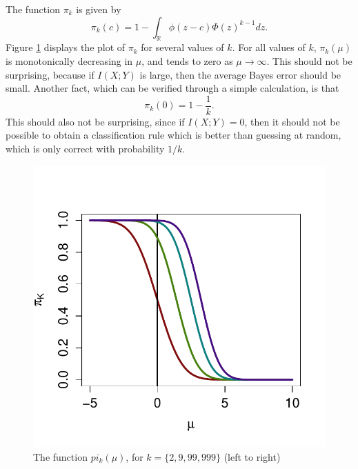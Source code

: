 \documentclass{article}
\begin{document}
The function $\pi_k$ is given by
\[
\pi_k(c) = 1 - \int_{\mathbb{R}} \phi(z - c)  \Phi(z)^{k-1} dz.
\]
Figure \ref{fig:pi} displays the plot of $\pi_k$ for several values of $k$.
For all values of $k$, $\pi_k(\mu)$ is monotonically decreasing in $\mu$, and tends to zero as $\mu \to \infty$.
This should not be surprising, because if $I(X; Y)$ is large, then the average Bayes error should be small.
Another fact, which can be verified through a simple calculation, is that 
\[
\pi_k(0) = 1 - \frac{1}{k}.
\]
This should also not be surprising, since if $I(X; Y) = 0$, then it should not be possible to
obtain a classification rule which is better than guessing at random, which is only correct with probability $1/k$.
\begin{figure}
\centering
\includegraphics[scale = 0.5, clip=true, trim=0 0.2in 0 0.5in]{../info_theory_sims/illus_piK.pdf}
\caption{The function $pi_k(\mu)$, for $k = \{2, 9, 99, 999\}$ (left to right) \label{fig:pi}}
\end{figure}
\end{document}
